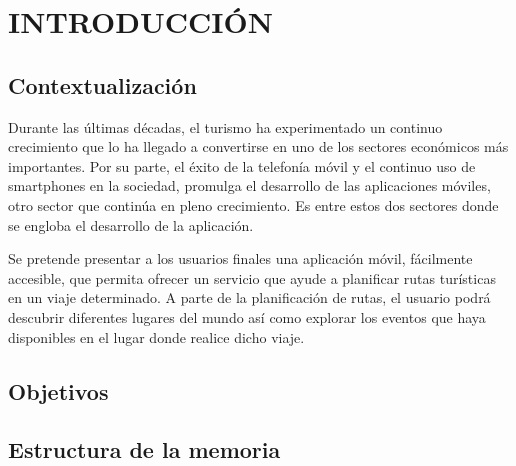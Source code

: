 \setcounter{page}{1}
\chapter[Introducción]{
  \label{chp:introduccion}
  INTRODUCCIÓN
}
\thispagestyle{numberingStyle}
\pagestyle{numberingStyle}


\section{Contextualización}
Durante las últimas décadas, el turismo ha experimentado un continuo crecimiento que lo ha llegado a convertirse en uno de los sectores económicos más importantes. Por su parte, el éxito de la telefonía móvil y el continuo uso de smartphones en la sociedad, promulga el desarrollo de las aplicaciones móviles, otro sector que continúa en pleno crecimiento. Es entre estos dos sectores donde se engloba el desarrollo de la aplicación.

Se pretende presentar a los usuarios finales una aplicación móvil, fácilmente accesible, que permita ofrecer un servicio que ayude a planificar rutas turísticas en un viaje determinado. A parte de la planificación de rutas, el usuario podrá descubrir diferentes lugares del mundo así como explorar los eventos que haya disponibles en el lugar donde realice dicho viaje.





\section{Objetivos}

\section{Estructura de la memoria}

